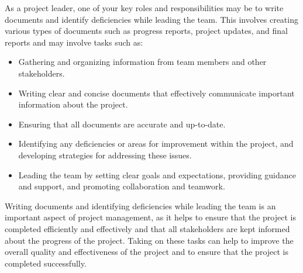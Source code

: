 \documentclass[12pt]{article}
\begin{document}
				As a project leader, one of your key roles and responsibilities may be to write documents and identify deficiencies while leading the team. This involves creating various types of documents such as progress reports, project updates, and final reports and may involve tasks such as:
				\begin{itemize}
					\item Gathering and organizing information from team members and other stakeholders.
					\item Writing clear and concise documents that effectively communicate important information about the project.
					\item Ensuring that all documents are accurate and up-to-date.
					\item Identifying any deficiencies or areas for improvement within the project, and developing strategies for addressing these issues.
					\item Leading the team by setting clear goals and expectations, providing guidance and support, and promoting collaboration and teamwork.
				\end{itemize}
			
				Writing documents and identifying deficiencies while leading the team is an important aspect of project management, as it helps to ensure that the project is completed efficiently and effectively and that all stakeholders are kept informed about the progress of the project. Taking on these tasks can help to improve the overall quality and effectiveness of the project and to ensure that the project is completed successfully.\\
				
\end{document}

